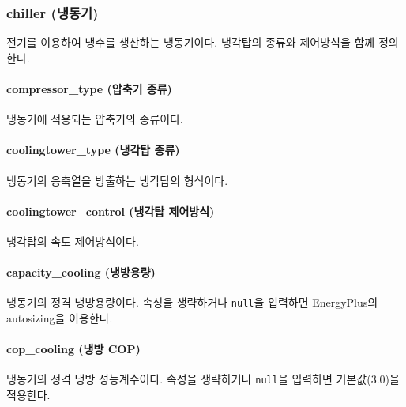 \subsubsection{chiller (냉동기)} \label{subsubsection:ioref:chiller}

전기를 이용하여 냉수를 생산하는 냉동기이다.
냉각탑의 종류와 제어방식을 함께 정의한다.


\paragraph{compressor\_type (압축기 종류)} 냉동기에 적용되는 압축기의 종류이다.

\paragraph{coolingtower\_type (냉각탑 종류)} 냉동기의 응축열을 방출하는 냉각탑의 형식이다.

\paragraph{coolingtower\_control (냉각탑 제어방식)} 냉각탑의 속도 제어방식이다.

\paragraph{capacity\_cooling (냉방용량)} 냉동기의 정격 냉방용량이다. 속성을 생략하거나 \texttt{null}을 입력하면 EnergyPlus의 autosizing을 이용한다.

\paragraph{cop\_cooling (냉방 COP)} 냉동기의 정격 냉방 성능계수이다. 속성을 생략하거나 \texttt{null}을 입력하면 기본값(3.0)을 적용한다.

